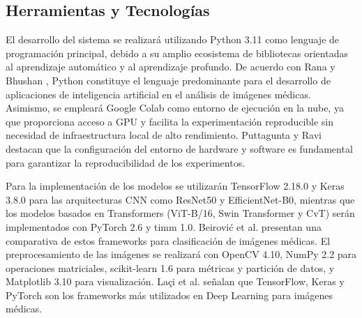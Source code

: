 \subsection{Herramientas y Tecnologías}
\label{sec:tools_technologies}

El desarrollo del sistema se realizará utilizando Python 3.11 como lenguaje de programación principal, debido a su amplio ecosistema de bibliotecas orientadas al aprendizaje automático y al aprendizaje profundo. De acuerdo con Rana y Bhushan \cite{Rana2022}, Python constituye el lenguaje predominante para el desarrollo de aplicaciones de inteligencia artificial en el análisis de imágenes médicas. Asimismo, se empleará Google Colab como entorno de ejecución en la nube, ya que proporciona acceso a GPU y facilita la experimentación reproducible sin necesidad de infraestructura local de alto rendimiento. Puttagunta y Ravi \cite{Puttagunta2021} destacan que la configuración del entorno de hardware y software es fundamental para garantizar la reproducibilidad de los experimentos.

Para la implementación de los modelos se utilizarán TensorFlow 2.18.0 y Keras 3.8.0 para las arquitecturas CNN como ResNet50 y EfficientNet-B0, mientras que los modelos basados en Transformers (ViT-B/16, Swin Transformer y CvT) serán implementados con PyTorch 2.6 y timm 1.0. Beirović et al. \cite{Beirovic2025} presentan una comparativa de estos frameworks para clasificación de imágenes médicas. El preprocesamiento de las imágenes se realizará con OpenCV 4.10, NumPy 2.2 para operaciones matriciales, scikit-learn 1.6 para métricas y partición de datos, y Matplotlib 3.10 para visualización. Laçi et al. \cite{Laci2025} señalan que TensorFlow, Keras y PyTorch son los frameworks más utilizados en Deep Learning para imágenes médicas.
